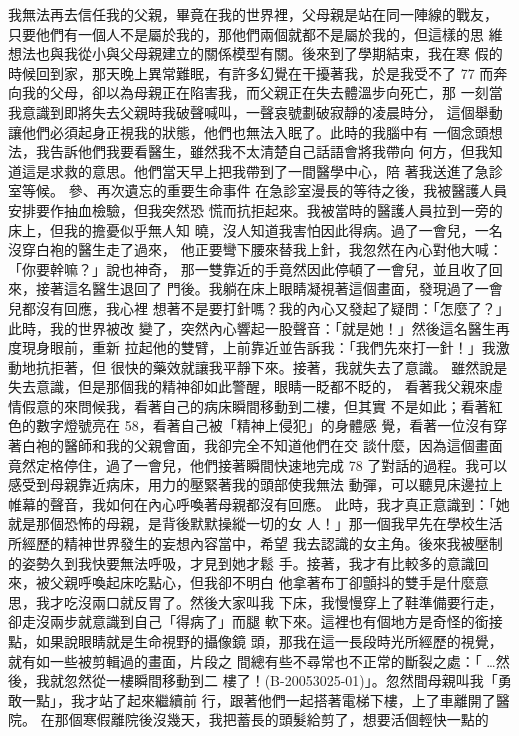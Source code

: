 我無法再去信任我的父親，畢竟在我的世界裡，父母親是站在同一陣線的戰友，
只要他們有一個人不是屬於我的，那他們兩個就都不是屬於我的，但這樣的思
維想法也與我從小與父母親建立的關係模型有關。後來到了學期結束，我在寒
假的時候回到家，那天晚上異常難眠，有許多幻覺在干擾著我，於是我受不了
77 
而奔向我的父母，卻以為母親正在陷害我，而父親正在失去體溫步向死亡，那
一刻當我意識到即將失去父親時我破聲喊叫，一聲哀號劃破寂靜的凌晨時分，
這個舉動讓他們必須起身正視我的狀態，他們也無法入眠了。此時的我腦中有
一個念頭想法，我告訴他們我要看醫生，雖然我不太清楚自己話語會將我帶向
何方，但我知道這是求救的意思。他們當天早上把我帶到了一間醫學中心，陪
著我送進了急診室等候。 
參、再次遺忘的重要生命事件 
在急診室漫長的等待之後，我被醫護人員安排要作抽血檢驗，但我突然恐
慌而抗拒起來。我被當時的醫護人員拉到一旁的床上，但我的擔憂似乎無人知
曉，沒人知道我害怕因此得病。過了一會兒，一名沒穿白袍的醫生走了過來，
他正要彎下腰來替我上針，我忽然在內心對他大喊：「你要幹嘛？」說也神奇，
那一雙靠近的手竟然因此停頓了一會兒，並且收了回來，接著這名醫生退回了
門後。我躺在床上眼睛凝視著這個畫面，發現過了一會兒都沒有回應，我心裡
想著不是要打針嗎？我的內心又發起了疑問：「怎麼了？」此時，我的世界被改
變了，突然內心響起一股聲音：「就是她！」然後這名醫生再度現身眼前，重新
拉起他的雙臂，上前靠近並告訴我：「我們先來打一針！」我激動地抗拒著，但
很快的藥效就讓我平靜下來。接著，我就失去了意識。 
雖然說是失去意識，但是那個我的精神卻如此警醒，眼睛一眨都不眨的，
看著我父親來虛情假意的來問候我，看著自己的病床瞬間移動到二樓，但其實
不是如此；看著紅色的數字燈號亮在 58，看著自己被「精神上侵犯」的身體感
覺，看著一位沒有穿著白袍的醫師和我的父親會面，我卻完全不知道他們在交
談什麼，因為這個畫面竟然定格停住，過了一會兒，他們接著瞬間快速地完成
78 
了對話的過程。我可以感受到母親靠近病床，用力的壓緊著我的頭部使我無法
動彈，可以聽見床邊拉上帷幕的聲音，我如何在內心呼喚著母親都沒有回應。
此時，我才真正意識到：「她就是那個恐怖的母親，是背後默默操縱一切的女
人！」那一個我早先在學校生活所經歷的精神世界發生的妄想內容當中，希望
我去認識的女主角。後來我被壓制的姿勢久到我快要無法呼吸，才見到她才鬆
手。接著，我才有比較多的意識回來，被父親呼喚起床吃點心，但我卻不明白
他拿著布丁卻顫抖的雙手是什麼意思，我才吃沒兩口就反胃了。然後大家叫我
下床，我慢慢穿上了鞋準備要行走，卻走沒兩步就意識到自己「得病了」而腿
軟下來。這裡也有個地方是奇怪的銜接點，如果說眼睛就是生命視野的攝像鏡
頭，那我在這一長段時光所經歷的視覺，就有如一些被剪輯過的畫面，片段之
間總有些不尋常也不正常的斷裂之處：「 …然後，我就忽然從一樓瞬間移動到二
樓了！(B-20053025-01)」。忽然間母親叫我「勇敢一點」，我才站了起來繼續前
行，跟著他們一起搭著電梯下樓，上了車離開了醫院。 
在那個寒假離院後沒幾天，我把蓄長的頭髮給剪了，想要活個輕快一點的
